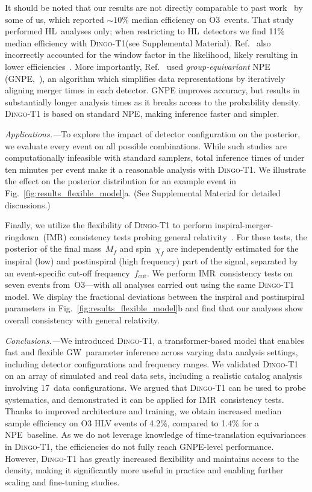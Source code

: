 \documentclass[aps,prl,twocolumn,nofootinbib,longbibliography,amsfonts,amssymb,amsmath,superscriptaddress]{revtex4-2}
\newcommand{\dingoT}{\mbox{\textsc{Dingo-T1}}\xspace}
\renewcommand{\sec}[1]{\emph{#1.---}}
\begin{document}
It should be noted that our results are not directly comparable to past work~\cite{dax_is:2022} by some of us, which reported $\sim\!10\%$ median efficiency on O3~events. 
That study performed HL~analyses only; when restricting to HL~detectors we find 11\% median efficiency with \dingoT (see Supplemental Material). Ref.~\cite{dax_is:2022} also incorrectly accounted for the window factor in the likelihood, likely resulting in lower efficiencies~\cite{talbot_window_fix:2025}. 
More importantly, Ref.~\cite{dax_is:2022} used \emph{group-equivariant} NPE (GNPE,~\cite{dax_dingo:2021,dax_gnpe:2021}), an algorithm which simplifies data representations by iteratively aligning merger times in each detector.
GNPE improves accuracy, but results in substantially longer analysis times as it breaks access to the probability density. 
\dingoT is based on standard NPE, making inference faster and simpler.

\sec{Applications}To explore the impact of detector configuration on the posterior, we evaluate every event on all possible combinations.
While such studies are computationally infeasible with standard samplers, total inference times of under ten minutes per event make it a reasonable analysis with \dingoT. 
We illustrate the effect on the posterior distribution for an example event in Fig.~\ref{fig:results_flexible_model}a.
(See Supplemental Material for detailed discussions.)

Finally, we utilize the flexibility of \dingoT to perform inspiral-merger-ringdown~(IMR) consistency tests probing general relativity~\citep{ghosh:2018, ligo_test_gr_gwtc2:2020, lvk_gwtc3_tests_gr:2025}.
For these tests, the posterior of the final mass~$M_f$ and spin~$\chi_f$ are independently estimated for the inspiral (low) and postinspiral (high frequency) part of the signal, separated by an event-specific cut-off frequency~$f_\mathrm{cut}$.
We perform IMR~consistency tests on seven events from~O3---with all analyses carried out using the same \dingoT model.
We display the fractional deviations between the inspiral and postinspiral parameters in Fig.~\ref{fig:results_flexible_model}b and find that our analyses show overall consistency with general relativity. 

\sec{Conclusions}We introduced \dingoT, a transformer-based model that enables fast and flexible GW~parameter inference across varying data analysis settings, including detector configurations and frequency ranges. 
We validated \dingoT on an array of simulated and real data sets, including a realistic catalog analysis involving 17~data configurations. 
We argued that \dingoT can be used to probe systematics, and demonstrated it can be applied for IMR~consistency tests. 
Thanks to improved architecture and training, we obtain increased median sample efficiency on O3 HLV events of 4.2\%, compared to 1.4\% for a NPE~baseline. 
As we do not leverage knowledge of time-translation equivariances in \dingoT, the efficiencies do not fully reach GNPE-level performance.
However, \dingoT has greatly increased flexibility and maintains access to the density, making it significantly more useful in practice and enabling further scaling and fine-tuning studies.
\end{document}
